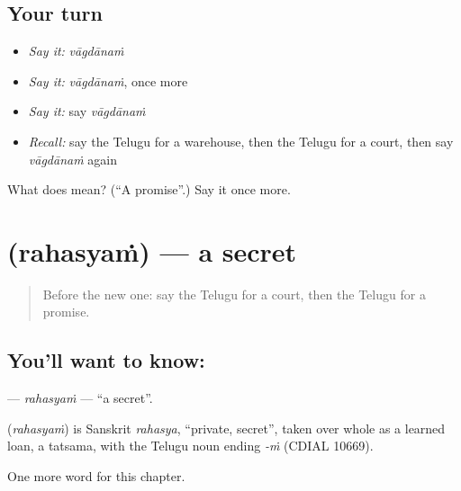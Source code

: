 \subsection*{Your turn}
\begin{itemize}
\raggedright
  \item \emph{Say it:} \emph{vāgdānaṁ}
  \item \emph{Say it:} \emph{vāgdānaṁ}, once more
  \item \emph{Say it:} say \emph{vāgdānaṁ}
  \item \emph{Recall:} say the Telugu for a warehouse, then the Telugu for a court, then say \emph{vāgdānaṁ} again
\end{itemize}

\begin{tcolorbox}[breakable,colback=teal!4,colframe=teal!35!black,title={Before you move on}]
What does  mean? (\textquotedblleft{}A promise\textquotedblright{}.) Say it once more.
\end{tcolorbox}
\section[\texorpdfstring{\te{రహస్యం} (rahasyaṁ)}{రహస్యం (rahasyaṁ)}]{ (rahasyaṁ) — a secret}

\label{lesson:TE-C257-rahasyam}



\begin{quote}
Before the new one: say the Telugu for a court, then the Telugu for a promise.
\end{quote}

\subsection*{You'll want to know: }
\textbf{} — \emph{rahasyaṁ} — \textquotedblleft{}a secret\textquotedblright{}.

\begin{cousinweb}
\textbf{} (\emph{rahasyaṁ}) is Sanskrit \emph{rahasya}, \textquotedblleft{}private, secret\textquotedblright{}, taken over whole as a learned loan, a tatsama, with the Telugu noun ending \emph{-ṁ} (CDIAL 10669).
\end{cousinweb}

\begin{grammarlens}[title={What you've built}]
One more word for this chapter.
\end{grammarlens}

